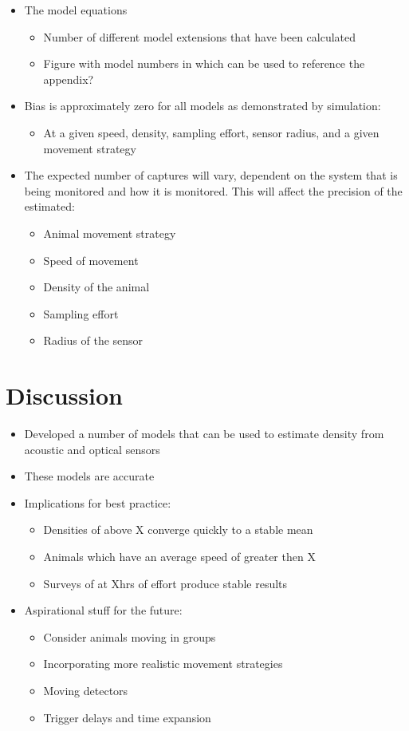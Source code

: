 \documentclass[a4paper,10pt,reqno,oneside]{amsart}
\begin{document}
\begin{itemize}
\item The model equations
	\begin{itemize}
	\item Number of different model extensions that have been calculated
	\item Figure with model numbers in which can be used to reference the appendix?
	\end{itemize}
\item Bias is approximately zero for all models as demonstrated by simulation: 
	\begin{itemize}
	\item At a given speed, density, sampling effort, sensor radius, and a given movement strategy
	\end{itemize}
\item The expected number of captures will vary, dependent on the system that is being monitored and how it is monitored. This will affect the precision of the estimated: 
	\begin{itemize}
	\item Animal movement strategy
	\item Speed of movement
	\item Density of the animal
	\item Sampling effort
	\item Radius of the sensor
	\end{itemize}
\end{itemize}


\section{Discussion}
\begin{itemize}
\item Developed a number of models that can be used to estimate density from acoustic and optical sensors 
\item These models are accurate 
\item Implications for best practice:
	\begin{itemize}
	\item Densities of above X converge quickly to a stable mean
	\item Animals which have an average speed of greater then X 
	\item Surveys of at Xhrs of effort produce stable results
	\end{itemize}
\item Aspirational stuff for the future:
	\begin{itemize}
	\item Consider animals moving in groups
	\item Incorporating more realistic movement strategies
	\item Moving detectors
	\item Trigger delays and time expansion
	\end{itemize}
\end{itemize}
\end{document}
